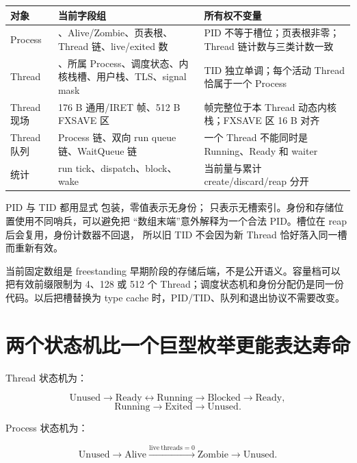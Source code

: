 \begin{longtable}{L{0.20\textwidth}L{0.31\textwidth}L{0.37\textwidth}}
\toprule
对象 & 当前字段组 & 所有权不变量\\
\midrule
Process &
、Alive/Zombie、页表根、Thread 链、live/exited 数 &
PID 不等于槽位；页表根非零；Thread 链计数与三类计数一致\\
Thread &
、所属 Process、调度状态、内核栈槽、用户栈、TLS、signal mask &
TID 独立单调；每个活动 Thread 恰属于一个 Process\\
Thread 现场 &
176 B 通用/IRET 帧、512 B FXSAVE 区 &
帧完整位于本 Thread 动态内核栈；FXSAVE 区 16 B 对齐\\
Thread 队列 &
Process 链、双向 run queue 链、WaitQueue 链 &
一个 Thread 不能同时是 Running、Ready 和 waiter\\
统计 &
run tick、dispatch、block、wake &
当前量与累计 create/discard/reap 分开\\
\bottomrule
\end{longtable}

PID 与 TID 都用显式  包装，零值表示无身份；
 只表示无槽索引。身份和存储位置使用不同哨兵，可以避免把
“数组末端”意外解释为一个合法 PID。槽位在 reap 后会复用，身份计数器不回退，
所以旧 TID 不会因为新 Thread 恰好落入同一槽而重新有效。

当前固定数组是 freestanding 早期阶段的存储后端，不是公开语义。容量档可以
把有效前缀限制为 4、128 或 512 个 Thread；调度状态机和身份分配仍是同一份
代码。以后把槽替换为 type cache 时，PID/TID、队列和退出协议不需要改变。

\section{两个状态机比一个巨型枚举更能表达寿命}

Thread 状态机为：

\[
  \text{Unused}\rightarrow\text{Ready}
  \leftrightarrow\text{Running}
  \rightarrow\text{Blocked}
  \rightarrow\text{Ready},
\]
\[
  \text{Running}\rightarrow\text{Exited}\rightarrow\text{Unused}.
\]

Process 状态机为：

\[
  \text{Unused}\rightarrow\text{Alive}
  \xrightarrow{\mathrm{live\ threads}=0}
  \text{Zombie}\rightarrow\text{Unused}.
\]

